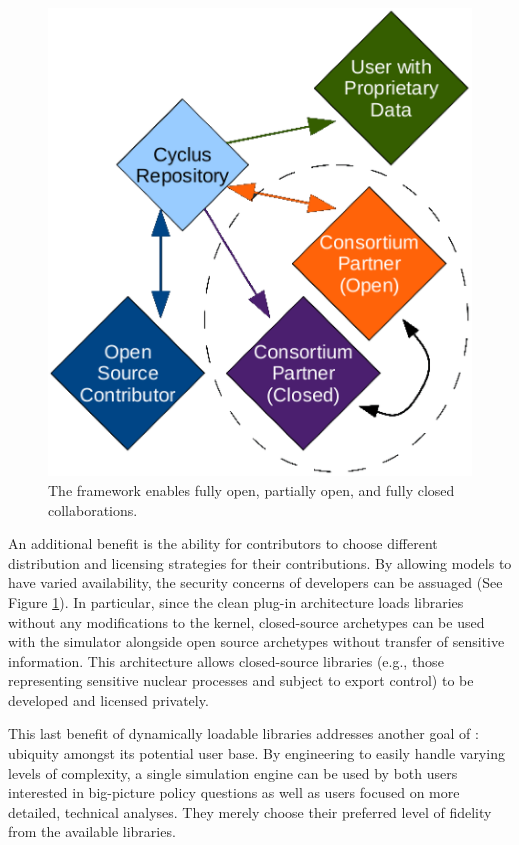 \begin{figure}[htbp!]
\begin{center}
\includegraphics{./images/modifiedopen.eps}
\end{center}
\caption{The \Cyclus framework enables fully open, partially open, and fully
closed collaborations\cite{carlsen_cyclus_2014}.}
\label{fig:modifiedopen}
\end{figure}

An additional benefit is the ability for
contributors to choose different distribution and licensing strategies
for their contributions. By allowing models to have varied
availability, the security concerns of developers can be
assuaged (See Figure \ref{fig:modifiedopen}).
In particular, since the clean plug-in architecture loads libraries without any
modifications to the \Cyclus kernel, closed-source archetypes can be used with
the simulator alongside open source archetypes without transfer of sensitive information. This architecture
allows closed-source libraries (e.g., those representing sensitive nuclear
processes and subject to export control) to be developed and licensed privately.

This last benefit of dynamically loadable libraries addresses
another goal of \Cyclus: ubiquity amongst its potential user base. By
engineering \Cyclus to easily handle varying levels of complexity, a single
simulation engine can be used by both users interested in big-picture policy
questions as well as users focused on more detailed, technical
analyses. They merely choose their preferred level of fidelity from the 
available libraries. 

